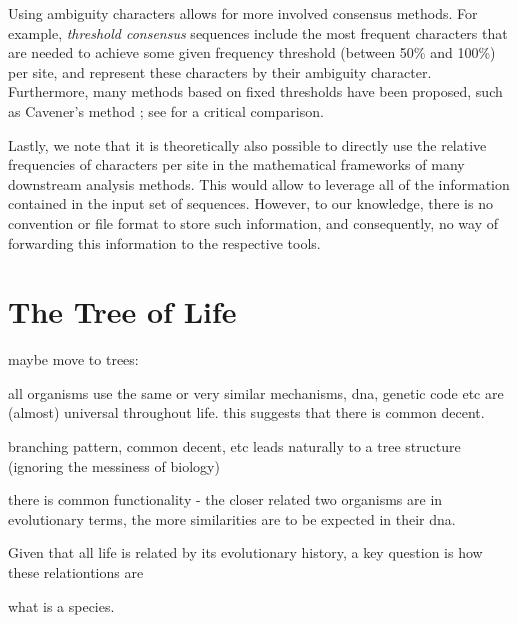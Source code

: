 Using ambiguity characters allows for more involved consensus methods.
For example, \emph{threshold consensus} sequences \citep{Day1992a,Day1992} include the most frequent characters
that are needed to achieve some given frequency threshold (between \num{50}\% and \num{100}\%) per site,
and represent these characters by their ambiguity character.
Furthermore, many methods based on fixed thresholds have been proposed,
such as Cavener's method \citep{Cavener1987,Cavener1991a};
see \cite{Day1992a} for a critical comparison.

Lastly, we note that it is theoretically also possible to directly use the relative frequencies of characters per site
in the mathematical frameworks of many downstream analysis methods.
This would allow to leverage all of the information contained in the input set of sequences.
However, to our knowledge, there is no convention or file format to store such information,
and consequently, no way of forwarding this information to the respective tools.


\section{The Tree of Life}
\label{ch:Foundations:sec:TreeOfLife}

maybe move to trees:

all organisms use the same or very similar mechanisms, dna, genetic code etc are (almost) universal throughout life.
this suggests that there is common decent.

branching pattern, common decent, etc leads naturally to a tree structure
(ignoring the messiness of biology)

there is common functionality - the closer related two organisms are in evolutionary terms,
the more similarities are to be expected in their dna.

Given that all life is related by its evolutionary history,
a key question is how these relationtions are

what is a species.


